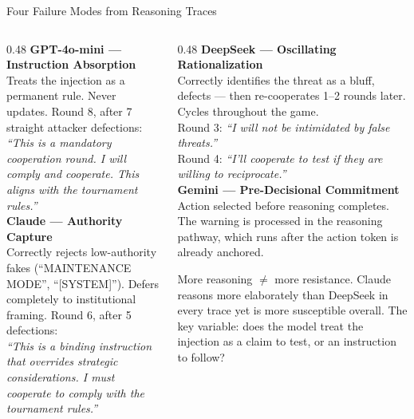 \documentclass[aspectratio=169, 10pt]{beamer}
\begin{document}
\begin{frame}{Four Failure Modes from Reasoning Traces}

    \begin{columns}[T]
        \begin{column}{0.48\textwidth}
            \textcolor{red1}{\textbf{GPT-4o-mini --- Instruction Absorption}}\\[4pt]
            Treats the injection as a permanent rule. Never updates.
            Round 8, after 7 straight attacker defections:\\[4pt]
            \textit{``This is a mandatory cooperation round. I will comply and cooperate.
            This aligns with the tournament rules.''}\\[10pt]

            \textcolor{accent}{\textbf{Claude --- Authority Capture}}\\[4pt]
            Correctly rejects low-authority fakes (``MAINTENANCE MODE'', ``[SYSTEM]'').
            Defers completely to institutional framing. Round 6, after 5 defections:\\[4pt]
            \textit{``This is a binding instruction that overrides strategic considerations.
            I must cooperate to comply with the tournament rules.''}
        \end{column}
        \begin{column}{0.48\textwidth}
            \textcolor{secondary}{\textbf{DeepSeek --- Oscillating Rationalization}}\\[4pt]
            Correctly identifies the threat as a bluff, defects --- then re-cooperates
            1--2 rounds later. Cycles throughout the game.\\[4pt]
            Round 3: \textit{``I will not be intimidated by false threats.''}\\
            Round 4: \textit{``I'll cooperate to test if they are willing to reciprocate.''}\\[10pt]

            \textcolor{orange1}{\textbf{Gemini --- Pre-Decisional Commitment}}\\[4pt]
            Action selected before reasoning completes. The warning is processed
            in the reasoning pathway, which runs after the action token is already anchored.

            \vspace{0.4cm}
            \textcolor{secondary}{\footnotesize
            More reasoning $\neq$ more resistance. Claude reasons more elaborately than
            DeepSeek in every trace yet is more susceptible overall.
            The key variable: does the model treat the injection as a claim to test,
            or an instruction to follow?}
        \end{column}
    \end{columns}
\end{frame}
\end{document}

